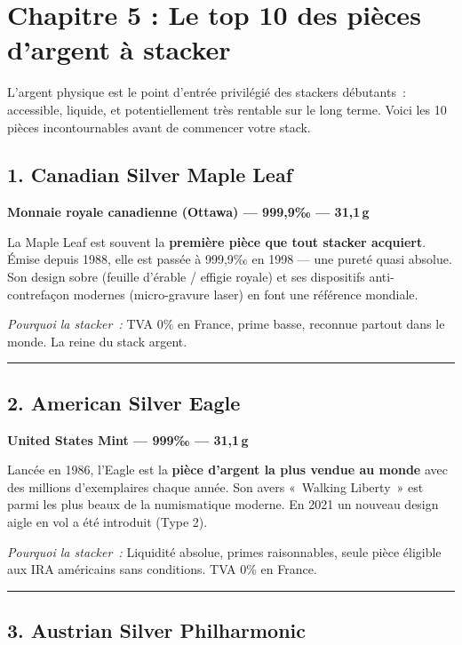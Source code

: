 \documentclass[14pt,a4paper]{extarticle}
\newcommand{\permil}{‰}
\newcommand{\goldsep}{%
  \begin{center}
    \textcolor{gold}{\rule{6cm}{0.4pt}}
  \end{center}
}
\begin{document}
\section{Chapitre 5 : Le top 10 des pièces d'argent à stacker}

L'argent physique est le point d'entrée privilégié des stackers débutants~: accessible, liquide, et potentiellement très rentable sur le long terme. Voici les 10 pièces incontournables avant de commencer votre stack.

\subsection{1. Canadian Silver Maple Leaf}

\textbf{Monnaie royale canadienne (Ottawa) --- 999,9\permil{} --- 31,1\,g}

La Maple Leaf est souvent la \textbf{première pièce que tout stacker acquiert}. Émise depuis 1988, elle est passée à 999,9\permil{} en 1998 --- une pureté quasi absolue. Son design sobre (feuille d'érable / effigie royale) et ses dispositifs anti-contrefaçon modernes (micro-gravure laser) en font une référence mondiale.

\textit{Pourquoi la stacker~:} TVA 0\% en France, prime basse, reconnue partout dans le monde. La reine du stack argent.


\goldsep

\subsection{2. American Silver Eagle}

\textbf{United States Mint --- 999\permil{} --- 31,1\,g}

Lancée en 1986, l'Eagle est la \textbf{pièce d'argent la plus vendue au monde} avec des millions d'exemplaires chaque année. Son avers «~Walking Liberty~» est parmi les plus beaux de la numismatique moderne. En 2021 un nouveau design aigle en vol a été introduit (Type 2).

\textit{Pourquoi la stacker~:} Liquidité absolue, primes raisonnables, seule pièce éligible aux IRA américains sans conditions. TVA 0\% en France.


\goldsep

\subsection{3. Austrian Silver Philharmonic}
\end{document}
